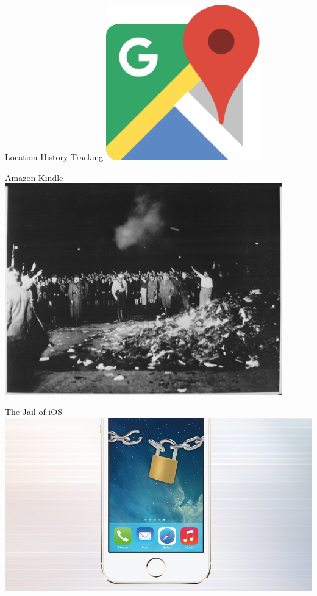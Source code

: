 \documentclass[pdf]{beamer}
\begin{document}
\begin{frame}{Location History Tracking}
  \center\includegraphics[width=0.5\textwidth]{google-map.png}
\end{frame}

\begin{frame}{Amazon Kindle}
  \center\includegraphics[width=0.9\textwidth]{kindle.jpg}
\end{frame}

\begin{frame}{The Jail of iOS}
  \includegraphics[width=\textwidth]{iOS-jail.jpg}
\end{frame}
\end{document}
